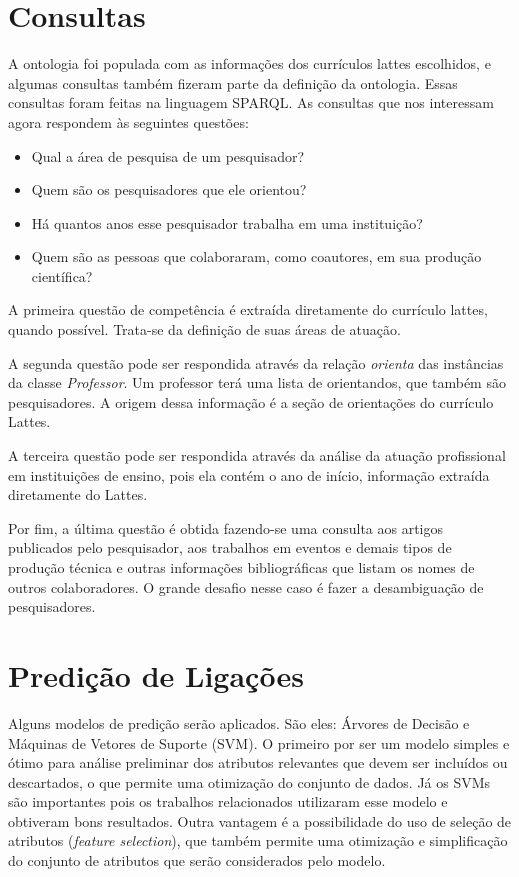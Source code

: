 \section{Consultas}
\label{sec:desenvolvimento-consultas}

A ontologia foi populada com as informações dos currículos lattes escolhidos, e algumas consultas também fizeram parte da definição da ontologia. Essas consultas foram feitas na linguagem SPARQL. As consultas que nos interessam agora respondem às seguintes questões:

\begin{itemize}
    \item Qual a área de pesquisa de um pesquisador?
    \item Quem são os pesquisadores que ele orientou?
    \item Há quantos anos esse pesquisador trabalha em uma instituição?
    \item Quem são as pessoas que colaboraram, como coautores, em sua produção científica?
\end{itemize}

A primeira questão de competência é extraída diretamente do currículo lattes, quando possível. Trata-se da definição de suas áreas de atuação.

A segunda questão pode ser respondida através da relação \textit{orienta} das instâncias da classe \textit{Professor}. Um professor terá uma lista de orientandos, que também são pesquisadores. A origem dessa informação é a seção de orientações do currículo Lattes.

A terceira questão pode ser respondida através da análise da atuação profissional em instituições de ensino, pois ela contém o ano de início, informação extraída diretamente do Lattes.

Por fim, a última questão é obtida fazendo-se uma consulta aos artigos publicados pelo pesquisador, aos trabalhos em eventos e demais tipos de produção técnica e outras informações bibliográficas que listam os nomes de outros colaboradores. O grande desafio nesse caso é fazer a desambiguação de pesquisadores.

\section{Predição de Ligações}
\label{sec:desenvolvimento-predicao}

Alguns modelos de predição serão aplicados. São eles: Árvores de Decisão e  Máquinas de Vetores de Suporte (SVM). O primeiro por ser um modelo simples e ótimo para análise preliminar dos atributos relevantes que devem ser incluídos ou descartados, o que permite uma otimização do conjunto de dados. Já os SVMs são importantes pois os trabalhos relacionados utilizaram esse modelo e obtiveram bons resultados. Outra vantagem é a possibilidade do uso de seleção de atributos (\textit{feature selection}), que também permite uma otimização e simplificação do conjunto de atributos que serão considerados pelo modelo.

